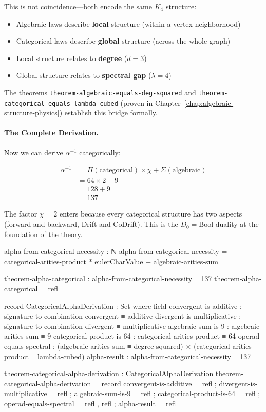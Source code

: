 \documentclass[11pt,a4paper]{book}
\begin{document}
This is not coincidence---both encode the same $K_4$ structure:
\begin{itemize}
\item Algebraic laws describe \textbf{local} structure (within a vertex neighborhood)
\item Categorical laws describe \textbf{global} structure (across the whole graph)
\item Local structure relates to \textbf{degree} ($d = 3$)
\item Global structure relates to \textbf{spectral gap} ($\lambda = 4$)
\end{itemize}

The theorems \verb|theorem-algebraic-equals-deg-squared| and 
\verb|theorem-categorical-equals-lambda-cubed| (proven in 
Chapter~\ref{chap:algebraic-structure-physics}) establish this bridge formally.

\paragraph{The Complete Derivation.}

Now we can derive $\alpha^{-1}$ categorically:

\begin{align*}
\alpha^{-1} &= \Pi(\text{categorical}) \times \chi + \Sigma(\text{algebraic}) \\
            &= 64 \times 2 + 9 \\
            &= 128 + 9 \\
            &= 137
\end{align*}

The factor $\chi = 2$ enters because every categorical structure has 
two aspects (forward and backward, Drift and CoDrift). This is the 
$D_0 = \text{Bool}$ duality at the foundation of the theory.

\begin{code}
alpha-from-categorical-necessity : ℕ
alpha-from-categorical-necessity = categorical-arities-product * eulerCharValue + algebraic-arities-sum

theorem-alpha-categorical : alpha-from-categorical-necessity ≡ 137
theorem-alpha-categorical = refl

record CategoricalAlphaDerivation : Set where
  field
    convergent-is-additive    : signature-to-combination convergent ≡ additive
    divergent-is-multiplicative : signature-to-combination divergent ≡ multiplicative
    algebraic-sum-is-9        : algebraic-arities-sum ≡ 9
    categorical-product-is-64 : categorical-arities-product ≡ 64
    operad-equals-spectral    : (algebraic-arities-sum ≡ degree-squared) × 
                                (categorical-arities-product ≡ lambda-cubed)
    alpha-result              : alpha-from-categorical-necessity ≡ 137

theorem-categorical-alpha-derivation : CategoricalAlphaDerivation
theorem-categorical-alpha-derivation = record
  { convergent-is-additive      = refl
  ; divergent-is-multiplicative = refl
  ; algebraic-sum-is-9          = refl
  ; categorical-product-is-64   = refl
  ; operad-equals-spectral      = refl , refl
  ; alpha-result                = refl
  }
\end{code}
\end{document}
